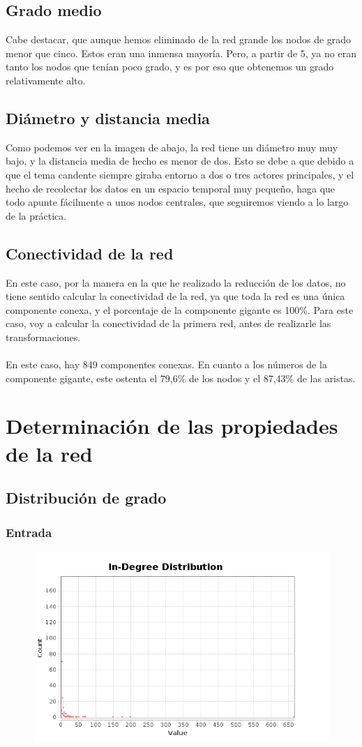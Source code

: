 \subsection{Grado medio}
Cabe destacar, que aunque hemos eliminado de la red grande los nodos de grado menor que cinco. Estos eran una inmensa mayoría. Pero, a partir de 5, ya no eran tanto los nodos que tenían poco grado, y es por eso que obtenemos un grado relativamente alto.


\subsection{Diámetro y distancia media}
Como podemos ver en la imagen de abajo, la red tiene un diámetro muy muy bajo, y la distancia media de hecho es menor de dos. Esto se debe a que debido a que el tema candente siempre giraba entorno a dos o tres actores principales, y el hecho de recolectar los datos en un espacio temporal muy pequeño, haga que todo apunte fácilmente a unos nodos centrales, que seguiremos viendo a lo largo de la práctica.

\newpage
\subsection{Conectividad de la red}

En este caso, por la manera en la que he realizado la reducción de los datos, no tiene sentido calcular la conectividad de la red, ya que toda la red es una única componente conexa, y el porcentaje de la componente gigante es 100\%. Para este caso, voy a calcular la conectividad de la primera red, antes de realizarle las transformaciones.
\\\\
En este caso, hay 849 componentes conexas. En cuanto a los números de la componente gigante, este ostenta el 79,6\% de los nodos y el 87,43\% de las aristas.

\section{Determinación de las propiedades de la red}
\subsection{Distribución de grado}
\subsubsection{Entrada}
\begin{figure}[H]
	\centering
	\includegraphics[width=0.6\linewidth]{Imagenes/screenshot005}
\end{figure}

